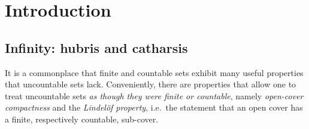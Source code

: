 \documentclass[reqno]{amsart}
\numberwithin{equation}{section}
\numberwithin{thm}{section}
\begin{document}
%

\maketitle
\thispagestyle{empty}
\vspace{-0.5cm}
\section{Introduction}
\subsection{Infinity: hubris and catharsis}
It is a commonplace that finite and countable sets exhibit many useful properties that uncountable sets lack.  
Conveniently, there are properties that allow one to treat uncountable sets \emph{as though they were finite or countable}, namely \emph{open-cover compactness} and the \emph{Lindel\"of property}, i.e.\  the statement that an open cover has a finite, respectively countable, sub-cover.  

\smallskip
\end{document}
